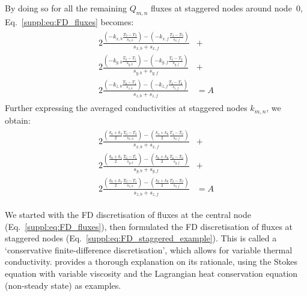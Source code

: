 By doing so for all the remaining $Q_{m,n}$ fluxes at staggered nodes around node~$0$, Eq.~\ref{suppl:eq:FD_fluxes} becomes:
\begin{align}
\begin{split}
    \label{suppl:eq:FD_fluxes_complete}
    2 \frac{
            \left( -k_{x,b} \displaystyle \frac{T_0 - T_3}{s_{x,b}} \right ) -
            \left( -k_{x,f} \displaystyle \frac{T_4 - T_0}{s_{x,f}} \right )
        }{s_{x,b} + s_{x,f}} &+ \\[1ex]
    2 \frac{
            \left( -k_{y,b} \displaystyle \frac{T_0 - T_5}{s_{y,b}} \right ) -
            \left( -k_{y,f} \displaystyle \frac{T_6 - T_0}{s_{y,f}} \right )
        }{s_{y,b} + s_{y,f}} &+ \\[1ex]
    2 \frac{
            \left( -k_{z,b} \displaystyle \frac{T_0 - T_1}{s_{z,b}} \right ) -
            \left( -k_{z,f} \displaystyle \frac{T_2 - T_0}{s_{z,f}} \right )
        }{s_{z,b} + s_{z,f}} &= A
\end{split}
\end{align}
Further expressing the averaged conductivities at staggered nodes $k_{m,n}$, we obtain:
\begin{align}
\begin{split}    
    \label{suppl:eq:FD_fluxes_complete_k}
    2 \frac{
            \left(
                \displaystyle \frac{k_0 + k_3}{2}
                \displaystyle \frac{T_0 - T_3}{s_{x,b}}
            \right ) -
            \left(
                \displaystyle \frac{k_4 + k_0}{2}
                \displaystyle \frac{T_4 - T_0}{s_{x,f}}
            \right )
        }{s_{x,b} + s_{x,f}} &+ \\[1ex]
    2 \frac{
            \left(
                \displaystyle \frac{k_0 + k_5}{2}
                \displaystyle \frac{T_0 - T_5}{s_{y,b}} \right ) -
            \left(
                \displaystyle \frac{k_6 + k_0}{2}
                \displaystyle \frac{T_6 - T_0}{s_{y,f}}
            \right )
        }{s_{y,b} + s_{y,f}} &+ \\[1ex]
    2 \frac{
            \left(
                \displaystyle \frac{k_0 + k_1}{2}
                \displaystyle \frac{T_0 - T_1}{s_{z,b}}
            \right ) -
            \left(
                \displaystyle \frac{k_2 + k_0}{2}
                \displaystyle \frac{T_2 - T_0}{s_{z,f}}
            \right )
        }{s_{z,b} + s_{z,f}} &= A
\end{split}
\end{align}

We started with the FD discretisation of fluxes at the central node (Eq.~\ref{suppl:eq:FD_fluxes}), then formulated the FD discretisation of fluxes at staggered nodes (Eq.~\ref{suppl:eq:FD_staggered_example}).
This is called a `conservative finite-difference discretisation', which allows for variable thermal conductivity.
\textcite{Gerya2010} provides a thorough explanation on its rationale, using the Stokes equation with variable viscosity and the Lagrangian heat conservation equation (non-steady state) as examples.


